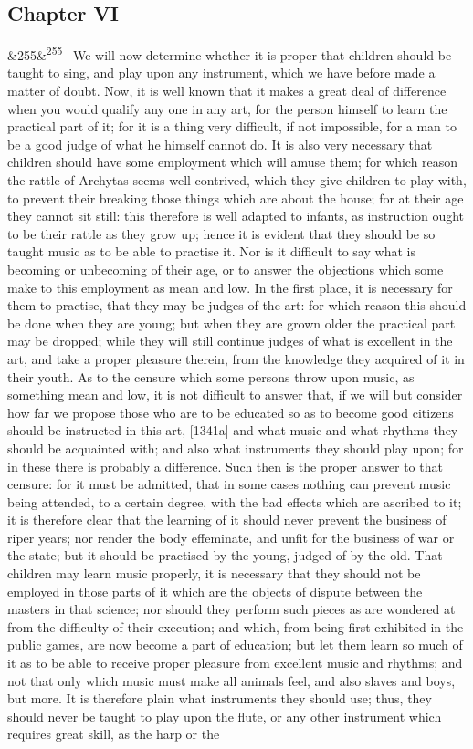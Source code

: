 \documentclass[12pt]{article}
\newcommand{\para}[1][]{\par\noindent\ifx&#1&\else\textsuperscript{\footnotesize #1}~\fi}
\begin{document}
\subsection*{Chapter VI}

\para[255] We will now determine whether it is proper that children should be taught to sing, and play upon any instrument, which we have before made a matter of doubt. Now, it is well known that it makes a great deal of difference when you would qualify any one in any art, for the person himself to learn the practical part of it; for it is a thing very difficult, if not impossible, for a man to be a good judge of what he himself cannot do. It is also very necessary that children should have some employment which will amuse them; for which reason the rattle of Archytas seems well contrived, which they give children to play with, to prevent their breaking those things which are about the house; for at their age they cannot sit still: this therefore is well adapted to infants, as instruction ought to be their rattle as they grow up; hence it is evident that they should be so taught music as to be able to practise it. Nor is it difficult to say what is becoming or unbecoming of their age, or to answer the objections which some make to this employment as mean and low. In the first place, it is necessary for them to practise, that they may be judges of the art: for which reason this should be done when they are young; but when they are grown older the practical part may be dropped; while they will still continue judges of what is excellent in the art, and take a proper pleasure therein, from the knowledge they acquired of it in their youth. As to the censure which some persons throw upon music, as something mean and low, it is not difficult to answer that, if we will but consider how far we propose those who are to be educated so as to become good citizens should be instructed in this art, [1341a] and what music and what rhythms they should be acquainted with; and also what instruments they should play upon; for in these there is probably a difference. Such then is the proper answer to that censure: for it must be admitted, that in some cases nothing can prevent music being attended, to a certain degree, with the bad effects which are ascribed to it; it is therefore clear that the learning of it should never prevent the business of riper years; nor render the body effeminate, and unfit for the business of war or the state; but it should be practised by the young, judged of by the old. That children may learn music properly, it is necessary that they should not be employed in those parts of it which are the objects of dispute between the masters in that science; nor should they perform such pieces as are wondered at from the difficulty of their execution; and which, from being first exhibited in the public games, are now become a part of education; but let them learn so much of it as to be able to receive proper pleasure from excellent music and rhythms; and not that only which music must make all animals feel, and also slaves and boys, but more. It is therefore plain what instruments they should use; thus, they should never be taught to play upon the flute, or any other instrument which requires great skill, as the harp or the 
\end{document}
